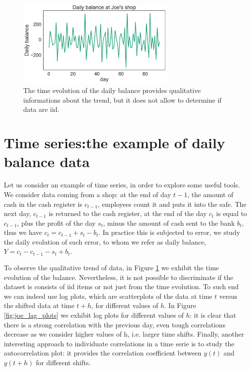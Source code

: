\documentclass[twoside,onecolumn]{article}
\theoremstyle{definition}
\begin{document}
\begin{figure} \centering
\includegraphics[width=0.7\textwidth]{../figs/joe_lineplot.pdf}
\caption{The time evolution of the daily balance provides qualitative informations about the trend, but it does not allow to determine if data are iid.}\label{fig:lineplot_joe}
\end{figure}

\section{Time series:the example of daily balance data}
Let us consider an example of time series, in order to explore some useful tools.
We consider data coming from a shop: at the end of day $t-1$, the amount of cash in the cash register is $c_{t-1}$, employees count it and puts it into the safe. The next day, $c_{t-1}$ is returned to the cash register, at the end of the day $c_t$ is equal to $c_{t-1}$, plus the profit of the day $s_t$, minus the amount of cash sent to the bank $b_t$, thus we have $c_t=c_{t-1}+s_t-b_t$. In practice this is subjected to error, we study the daily evolution of such error, to whom we refer as daily balance, $Y=c_t-c_{t-1}-s_t+b_t$.

To observe the qualitative trend of data, in Figure \ref{fig:lineplot_joe} we exhibit the time evolution of the balance. Nevertheless, it is not possible to discriminate if the dataset is consists of iid items or not just from the time evolution. To such end we can indeed use log plots, which are scatterplots of the data at time $t$ versus the shifted data at time $t+h$, for different values of $h$. In Figure \ref{fig:joe_lag_plots} we exhibit log plots for different values of $h$: it is clear that there is a strong correlation with the previous day, even tough correlations decrease as we consider higher values of h, i.e. larger time shifts. Finally, another interesting approach to individuate correlations in a time serie is to study the autocorrelation plot: it provides the correlation coefficient between $y(t)$ and $y(t+h)$ for different shifts.
\end{document}
